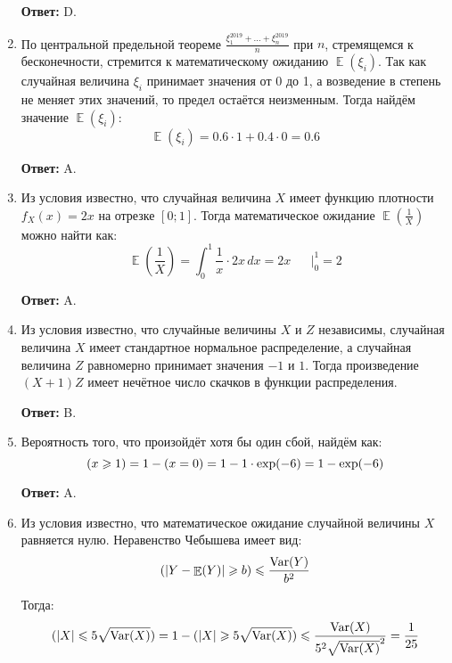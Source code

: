 \documentclass[a4paper]{article} %
\DeclareMathOperator{\Var}{Var}
\DeclareMathOperator{\E}{\mathbb{E}}
\let\P\relax
\DeclareMathOperator{\P}{\mathbb{P}}
\renewcommand{\le}{\leqslant}
\renewcommand{\ge}{\geqslant}
\begin{document}
\begin{enumerate}
    \textbf{Ответ:} D.
    
    
    \item
    По центральной предельной теореме $\frac{\xi_{1}^{2019} + \ldots + \xi_{n}^{2019}}{n}$ при $n$, стремящемся к бесконечности, стремится к математическому ожиданию $\E(\xi_{i})$.
    Так как случайная величина $\xi_{i}$ принимает значения от 0 до 1, а возведение в степень не меняет этих значений, то предел остаётся неизменным.
    Тогда найдём значение $\E(\xi_{i})$:
    \[
    \E(\xi_{i}) = 0.6 \cdot 1 + 0.4 \cdot 0 = 0.6
    \]

    \textbf{Ответ:} A.
    
    \item
    Из условия известно, что случайная величина $X$ имеет функцию плотности $f_{X}(x) = 2x$ на отрезке $[0; 1]$.
    Тогда математическое ожидание $\E\left(\frac{1}{X} \right)$ можно найти как:
    \[
    \E\left(\frac{1}{X} \right) = \int_{0}^{1} \frac{1}{x} \cdot 2x \,dx = 2x \left.\begin{matrix} & \\ & \end{matrix}\right|_{0}^{1} = 2
    \]
    
    \textbf{Ответ:} A.
    
    
    \item
    Из условия известно, что случайные величины $X$ и $Z$ независимы, случайная величина $X$ имеет стандартное нормальное распределение, а случайная величина $Z$ равномерно принимает значения $-1$ и $1$.
    Тогда произведение $(X + 1)Z$ имеет нечётное число скачков в функции распределения.
    
    \textbf{Ответ:} B.
    
    
    \item
    Вероятность того, что произойдёт хотя бы один сбой, найдём как:
    \[
    \P(x \ge 1) = 1 - \P(x = 0) = 1 - 1 \cdot \exp(-6) = 1 - \exp(-6)
    \]
    
    \textbf{Ответ:} A.
    
    
    \item
    Из условия известно, что математическое ожидание случайной величины $X$ равняется нулю.
    Неравенство Чебышева имеет вид:
    \[
    \P(\abs{Y - \E(Y)} \ge b) \le \frac{\Var(Y)}{b^{2}}
    \]
    
    Тогда:
    \[
    \P(\abs{X} \le 5\sqrt{\Var(X)}) = 1 - \P(\abs{X} \ge 5\sqrt{\Var(X)}) \le \frac{\Var(X)}{5^{2}\sqrt{\Var(X)}^{2}} = \frac{1}{25}
    \]
    

\end{enumerate}
\end{document}
